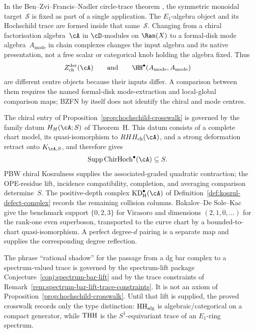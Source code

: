 \begin{remark}
\label{rem:bzfn-ambient-not-dial}
In the Ben--Zvi--Francis--Nadler circle-trace theorem
\cite{BZFN10}, the symmetric monoidal target~$\mathcal S$ is fixed
as part of a single application. The $E_1$-algebra object and its
Hochschild trace are formed inside that same~$\mathcal S$. Changing
from a chiral factorisation algebra~$\cA$ in $\cD$-modules on
$\Ran(X)$ to a formal-disk mode algebra~$A_{\mathrm{mode}}$ in
chain complexes changes the input algebra and its native
presentation, not a free scalar or categorical knob holding the
algebra fixed. Thus
\[
 Z^{\mathrm{der}}_{\mathrm{ch}}(\cA)
 \qquad\text{and}\qquad
 \HH^\bullet(A_{\mathrm{mode}},A_{\mathrm{mode}})
\]
are different centre objects because their inputs differ. A comparison
between them requires the named formal-disk mode-extraction and
local-global comparison maps; BZFN by itself does not identify the
chiral and mode centres.
\end{remark}

\begin{remark}
\label{rem:hochschild-crosswalk-theorem-h-package}
The chiral entry of Proposition~\ref{prop:hochschild-crosswalk} is
governed by the family datum $H_H(\cA;S)$ of Theorem~H.  This datum
consists of a complete chart model, its quasi-isomorphism to
$RHH_{\mathrm{ch}}(\cA)$, and a strong deformation retract onto
$K_{\cA,S}$, and therefore gives
\[
 \operatorname{Supp}\ChirHoch^\bullet(\cA)\subseteq S.
\]
PBW chiral Koszulness supplies the associated-graded quadratic
contraction; the OPE-residue lift, incidence compatibility,
completion, and averaging comparison determine~$S$.  The
positive-depth complex $\mathrm{KD}_{\mathrm H}^{\bullet}(\cA)$ of
Definition~\ref{def:koszul-defect-complex} records the remaining
collision columns.  Bakalov--De Sole--Kac give the benchmark support
$\{0,2,3\}$ for Virasoro and dimensions $(2,1,0,\ldots)$ for the
rank-one even superboson, transported to the curve chart by a
bounded-to-chart quasi-isomorphism.  A perfect degree-$d$ pairing is
a separate map and supplies the corresponding degree reflection.
\end{remark}

\begin{remark}
\label{rem:hochschild-crosswalk-spectrum-lift-package}
The phrase ``rational shadow'' for the passage from a dg bar complex
to a spectrum-valued trace is governed by the spectrum-lift package
Conjecture~\ref{conj:spectrum-bar-lift} and by the trace constraints
of Remark~\ref{rem:spectrum-bar-lift-trace-constraints}. It is not an
axiom of Proposition~\ref{prop:hochschild-crosswalk}. Until that lift
is supplied, the proved crosswalk records only the type distinction:
$\mathrm{HH}_{\mathrm{alg}}$ is algebraic/categorical on a compact generator, while
$\mathrm{THH}$ is the $S^1$-equivariant trace of an $E_1$-ring spectrum.
\end{remark}

